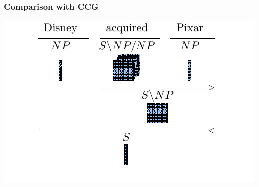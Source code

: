 \documentclass[mathserif,12pt]{beamer}
\begin{document}
\begin{frame}  
\frametitle{Comparison with CCG}
\centering
\includegraphics[trim=3em 1em 3em 0em,clip=true,scale=1.3]{figures/ccg-transitive-svo-derivation-tensors} 
\end{frame}
\end{document}
